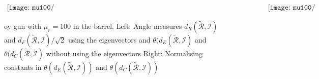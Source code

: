 \documentclass[a4paper,12]{article}
\theoremstyle{definition}
\begin{document}
\begin{figure}[h]
\begin{center}
$\begin{array}{cc}
\texttt{[image: mu100/OCC\_Gun\_modelv2\_nonsym\_StainSt\_RtildeI\_al\_0.01\_100,1\_sig\_1e6,1e8\_ord\_5.pdf]} &
\texttt{[image: mu100/OCC\_Gun\_modelv2\_nonsym\_StainSt\_Rtilde0I\_den\_al\_0.01\_100,1\_sig\_1e6,1e8\_ord\_5.pdf]} 
\end{array}$
\end{center}
\caption{oy gun with $\mu_r=100$ in the barrel. Left: Angle measures $d_R(\tilde{\mathcal R}, {\mathcal I})$ and $d_F(\tilde{\mathcal R}, {\mathcal I})/\sqrt{2}$ using the eigenvectors and $\theta(d_E(\tilde{\mathcal R}, {\mathcal I}) $ and $\theta(d_C(\tilde{\mathcal R} , {\mathcal I} ) $ without using the eigenvectors Right: Normalising constants in  $\theta(d_E(\tilde{\mathcal R}, {\mathcal I}))$ and $\theta(d_C(\tilde{\mathcal R}, {\mathcal I}))$}
\end{figure}
\end{document}
